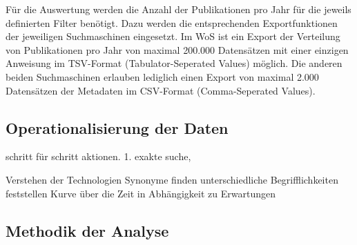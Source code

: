 Für die Auswertung werden die Anzahl der Publikationen pro Jahr für die jeweils definierten Filter benötigt. Dazu werden die entsprechenden Exportfunktionen der jeweiligen Suchmaschinen eingesetzt. Im WoS ist ein Export der Verteilung von Publikationen pro Jahr von maximal 200.000 Datensätzen mit einer einzigen Anweisung im TSV-Format (Tabulator-Seperated Values) möglich. Die anderen beiden Suchmaschinen erlauben lediglich einen Export von maximal 2.000 Datensätzen der Metadaten im CSV-Format (Comma-Seperated Values).

\subsection{Operationalisierung der Daten}
schritt für schritt aktionen. 1. exakte suche,

Verstehen der Technologien
Synonyme finden
unterschiedliche Begrifflichkeiten feststellen
Kurve über die Zeit in Abhängigkeit zu Erwartungen

\subsection{Methodik der Analyse}